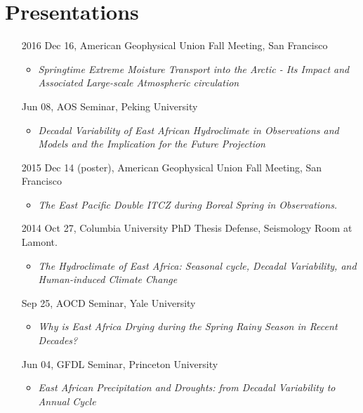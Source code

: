 \documentclass[11pt]{article}
\newcommand{\meetingName}[1]{#1}
\newcommand{\ptitle}[1]{\textit{#1}}
\begin{document}
\section{Presentations}
\begin{itemize}[leftmargin=10ex, itemsep=1ex]
    \item[2016]Dec 16, \meetingName{American Geophysical Union Fall Meeting}, San Francisco
    \begin{itemize}[leftmargin=4ex, parsep=0ex]
		\item \ptitle{Springtime Extreme Moisture Transport into the Arctic - Its Impact and Associated Large-scale Atmospheric circulation}
		\end{itemize}

	\item[\phantom{2016}] Jun 08, \meetingName{AOS Seminar}, Peking University
	\begin{itemize}[leftmargin=4ex]
		\item \ptitle{Decadal Variability of East African Hydroclimate in Observations and Models and the Implication for the Future Projection}
		\end{itemize}

	\item[2015]Dec 14 (poster),  \meetingName{American Geophysical Union Fall Meeting}, San Francisco
	\begin{itemize}[leftmargin=4ex]
		\item \ptitle{The East Pacific Double ITCZ during Boreal Spring in Observations.}
		\end{itemize}

	\item [2014] Oct 27,  \meetingName{Columbia University PhD Thesis Defense}, Seismology Room at Lamont.
	\begin{itemize}[leftmargin=4ex]
		\item \ptitle{The Hydroclimate of East Africa: Seasonal cycle, Decadal Variability, and Human-induced Climate Change}
		\end{itemize}

	\item[\phantom{2014}] Sep 25, \meetingName{AOCD Seminar}, Yale University
	 \begin{itemize}[leftmargin=4ex]
		\item \ptitle{Why is East Africa Drying during the Spring Rainy Season in Recent Decades?}
		\end{itemize}

	\item [\phantom{2014}]Jun 04,  \meetingName{GFDL Seminar}, Princeton University
	 \begin{itemize}[leftmargin=4ex]
		\item \ptitle{East African Precipitation and Droughts: from Decadal Variability to Annual Cycle}
		\end{itemize}


\end{itemize}
\end{document}
